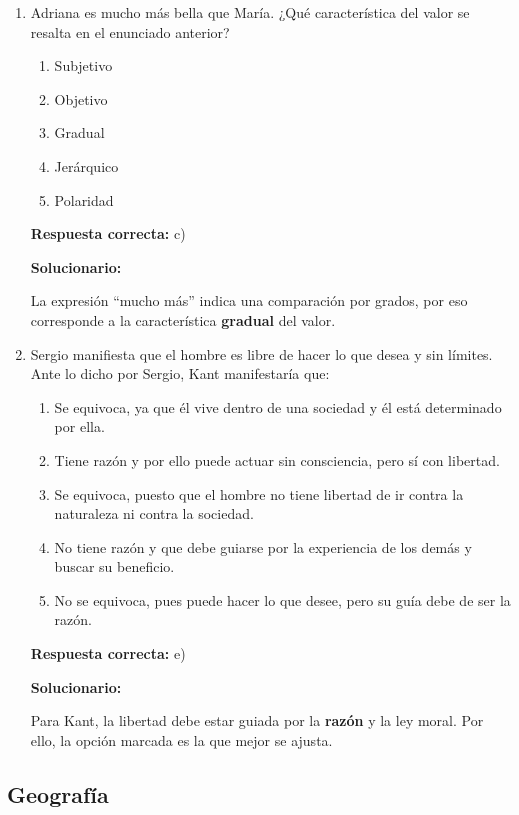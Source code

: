 \begin{enumerate}[resume]
	\item Adriana es mucho más bella que María. ¿Qué característica del valor se resalta en el enunciado anterior?
	\begin{enumerate}[label=\alph*)]
		\item Subjetivo
		\item Objetivo
		\item Gradual
		\item Jerárquico
		\item Polaridad
	\end{enumerate}
	\textbf{Respuesta correcta:} c)
	
	\vspace{2mm}
	\textbf{Solucionario:}
	
	La expresión “mucho más” indica una comparación por grados, por eso corresponde a la característica \textbf{gradual} del valor.
	
	\vspace{6mm}
	
	\item Sergio manifiesta que el hombre es libre de hacer lo que desea y sin límites. Ante lo dicho por Sergio, Kant manifestaría que:
	\begin{enumerate}[label=\alph*)]
		\item Se equivoca, ya que él vive dentro de una sociedad y él está determinado por ella.
		\item Tiene razón y por ello puede actuar sin consciencia, pero sí con libertad.
		\item Se equivoca, puesto que el hombre no tiene libertad de ir contra la naturaleza ni contra la sociedad.
		\item No tiene razón y que debe guiarse por la experiencia de los demás y buscar su beneficio.
		\item No se equivoca, pues puede hacer lo que desee, pero su guía debe de ser la razón.
	\end{enumerate}
	\textbf{Respuesta correcta:} e)
	
	\vspace{2mm}
	\textbf{Solucionario:}
	
	Para Kant, la libertad debe estar guiada por la \textbf{razón} y la ley moral. Por ello, la opción marcada es la que mejor se ajusta.
	
	\vspace{6mm}
	
\end{enumerate}

\subsection*{Geografía}

